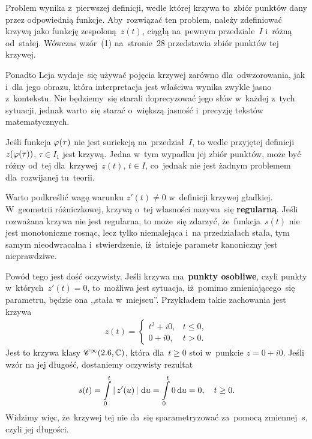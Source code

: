 \documentclass[a4paper,11pt]{article}
\begin{document}
Problem wynika z~pierwszej definicji, wedle której krzywa to~zbiór
punktów dany przez odpowiednią funkcje. Aby~rozwiązać ten problem,
należy zdefiniować krzywą jako funkcję zespoloną~$z( t )$, ciągłą
na~pewnym przedziale~$I$ i~różną od~stałej. Wówczas wzór~(1)
na~stronie~28 przedstawia zbiór punktów tej krzywej.

Ponadto Leja wydaje~się używać pojęcia krzywej zarówno
dla~odwzorowania, jak i~dla jego obrazu, która interpretacja jest
właściwa wynika zwykle jasno z~kontekstu. Nie będziemy~się starali
doprecyzować jego słów w~każdej z~tych sytuacji, jednak warto~się
starać o~większą jasność i~precyzję tekstów matematycznych.

\vspace{\spaceFour}


\start {} Jeśli funkcja $\varphi( \tau )$ nie jest suriekcją
na~przedział~$I$, to wedle przyjętej definicji~$z( \varphi( \tau ) )$,
$\tau \in I_{ 1 }$ jest krzywą. Jedna w~tym wypadku jej zbiór punktów,
może być różny od~tej dla~krzywej~$z( t )$, $t \in I$, co~jednak nie
jest żadnym problemem dla~rozwijanej tu~teorii.

\vspace{\spaceFour}


\start {} Warto podkreślić wagę warunku $z'( t ) \neq 0$
w~definicji krzywej gładkiej. W~geometrii różniczkowej, krzywą o~tej
własności nazywa~się \textbf{regularną}. Jeśli rozważana krzywa nie
jest regularna, to może~się zdarzyć, że~funkcja~$s( t )$ nie jest
monotoniczne rosnąc, lecz tylko niemalejąca i~na przedziałach stała,
tym samym nieodwracalna i~stwierdzenie, iż~istnieje parametr
kanoniczny jest nieprawdziwe.

Powód tego jest dość oczywisty. Jeśli krzywa ma~\textbf{punkty
  osobliwe}, czyli punkty w~których~$z'( t ) = 0$, to~możliwa jest
sytuacja, iż~pomimo zmieniającego~się parametru, będzie ona ,,stała
w~miejscu''. Przykładem takie zachowania jest krzywa
\begin{equation}
  \label{eq:Leja-28}
  \begin{split}
    z( t ) =
    \begin{cases}
      t^{ 2 } + i 0, & t \leq 0, \\
      0 + i 0, & t > 0.
    \end{cases}
  \end{split}
\end{equation}
Jest to krzywa klasy $\mathcal{C}^{ \infty }( 2.6, \mathbb{C} )$, która dla~$t \geq 0$ stoi
w~punkcie $z = 0 + i 0$. Jeśli wzór na jej długość, dostaniemy
oczywisty rezultat
\begin{equation}
  \label{eq:Leja-29}
  \begin{split}
    s( t ) = \int\limits_{ 0 }^{ t } \left| \,  z'( u )  \, \right| \, \mathrm{d} u = \int\limits_{ 0 }^{
      t } 0 \, \mathrm{d} u = 0, \quad t \geq 0.
  \end{split}
\end{equation}
Widzimy więc, że~krzywej tej nie da~się sparametryzować za~pomocą
zmiennej~$s$, czyli jej długości.
\end{document}
